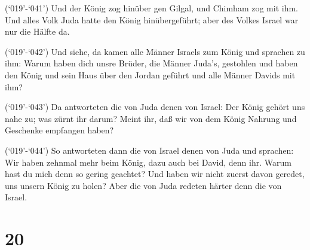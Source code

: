  (`019'-`041') Und der König zog hinüber gen Gilgal, und
Chimham zog mit ihm. Und alles Volk Juda hatte den König hinübergeführt;
aber des Volkes Israel war nur die Hälfte da.

 (`019'-`042') Und siehe, da kamen alle Männer Israels zum
König und sprachen zu ihm: Warum haben dich unsre Brüder, die Männer
Juda's, gestohlen und haben den König und sein Haus über den Jordan
geführt und alle Männer Davids mit ihm?

 (`019'-`043') Da antworteten die von Juda denen von
Israel: Der König gehört uns nahe zu; was zürnt ihr darum? Meint ihr,
daß wir von dem König Nahrung und Geschenke empfangen haben?

 (`019'-`044') So antworteten dann die von Israel denen von
Juda und sprachen: Wir haben zehnmal mehr beim König, dazu auch bei
David, denn ihr. Warum hast du mich denn so gering geachtet? Und haben
wir nicht zuerst davon geredet, uns unsern König zu holen? Aber die von
Juda redeten härter denn die von Israel.

\hypertarget{section-19}{%
\section{20}\label{section-19}}

